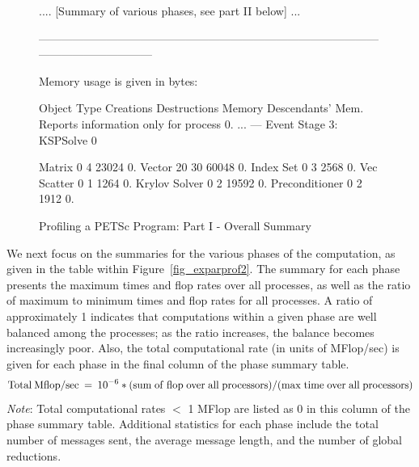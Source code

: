\begin{figure}[tb]
\begin{outputlisting}[\tiny\ttfamily]
.... [Summary of various phases, see part II below] ...

------------------------------------------------------------------------------------------------------------------------

Memory usage is given in bytes:

Object Type          Creations   Destructions     Memory  Descendants' Mem.
Reports information only for process 0.
...
--- Event Stage 3: KSPSolve 0

              Matrix     0              4        23024     0.
              Vector    20             30        60048     0.
           Index Set     0              3         2568     0.
         Vec Scatter     0              1         1264     0.
       Krylov Solver     0              2        19592     0.
      Preconditioner     0              2         1912     0.

\end{outputlisting}
\caption{Profiling a PETSc Program: Part I - Overall Summary}
\label{fig_exparprof}
\end{figure}

We next focus on the summaries for the various phases of the
computation, as given in the table within Figure~\ref{fig_exparprof2}.  The summary for
each phase presents the maximum times and flop rates over all
processes, as well as the ratio of maximum to minimum times and flop
rates for all processes.  A ratio of approximately 1 indicates that
computations within a given phase are well balanced among the
processes; as the ratio increases, the balance becomes increasingly
poor.  Also, the total computational rate (in units of MFlop/sec) is
given for each phase in the final column of the phase summary table.
\[
   {\rm Total\: Mflop/sec} \:=\: 10^{-6} * ({\rm sum\; of\; flop\; over\; all\; processors})/({\rm max\; time\; over\; all\; processors})
\]
{\em Note}: Total computational rates $<$ 1 MFlop are listed as 0 in this column
of the phase summary table.
Additional statistics for each phase include the total number of messages sent,
the average message length, and the number of global reductions.

